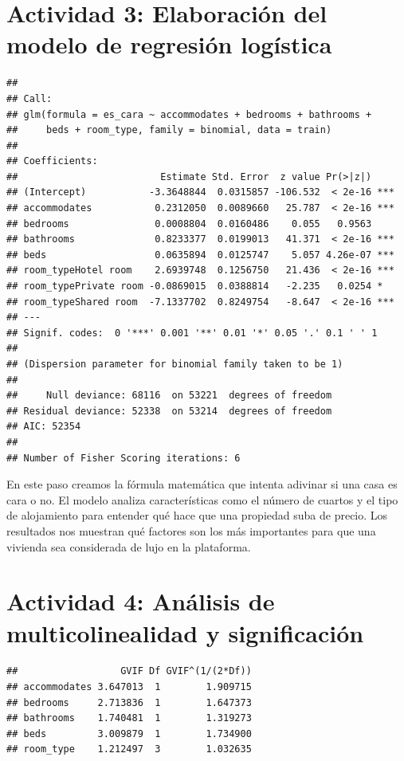 \documentclass[
]{article}
\begin{document}
\section{Actividad 3: Elaboración del modelo de regresión
logística}\label{actividad-3-elaboraciuxf3n-del-modelo-de-regresiuxf3n-loguxedstica}

\begin{verbatim}
## 
## Call:
## glm(formula = es_cara ~ accommodates + bedrooms + bathrooms + 
##     beds + room_type, family = binomial, data = train)
## 
## Coefficients:
##                         Estimate Std. Error  z value Pr(>|z|)    
## (Intercept)           -3.3648844  0.0315857 -106.532  < 2e-16 ***
## accommodates           0.2312050  0.0089660   25.787  < 2e-16 ***
## bedrooms               0.0008804  0.0160486    0.055   0.9563    
## bathrooms              0.8233377  0.0199013   41.371  < 2e-16 ***
## beds                   0.0635894  0.0125747    5.057 4.26e-07 ***
## room_typeHotel room    2.6939748  0.1256750   21.436  < 2e-16 ***
## room_typePrivate room -0.0869015  0.0388814   -2.235   0.0254 *  
## room_typeShared room  -7.1337702  0.8249754   -8.647  < 2e-16 ***
## ---
## Signif. codes:  0 '***' 0.001 '**' 0.01 '*' 0.05 '.' 0.1 ' ' 1
## 
## (Dispersion parameter for binomial family taken to be 1)
## 
##     Null deviance: 68116  on 53221  degrees of freedom
## Residual deviance: 52338  on 53214  degrees of freedom
## AIC: 52354
## 
## Number of Fisher Scoring iterations: 6
\end{verbatim}

En este paso creamos la fórmula matemática que intenta adivinar si una
casa es cara o no. El modelo analiza características como el número de
cuartos y el tipo de alojamiento para entender qué hace que una
propiedad suba de precio. Los resultados nos muestran qué factores son
los más importantes para que una vivienda sea considerada de lujo en la
plataforma.

\section{Actividad 4: Análisis de multicolinealidad y
significación}\label{actividad-4-anuxe1lisis-de-multicolinealidad-y-significaciuxf3n}

\begin{verbatim}
##                  GVIF Df GVIF^(1/(2*Df))
## accommodates 3.647013  1        1.909715
## bedrooms     2.713836  1        1.647373
## bathrooms    1.740481  1        1.319273
## beds         3.009879  1        1.734900
## room_type    1.212497  3        1.032635
\end{verbatim}
\end{document}
